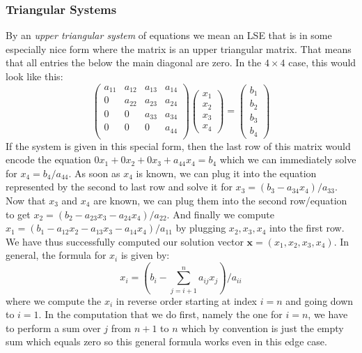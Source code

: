 \subsubsection{Triangular Systems}
By an \emph{upper triangular system} of equations we mean an LSE that is in some especially nice form where the matrix is an upper triangular matrix. That means that all entries the below the main diagonal are zero. In the  $4 \times 4$ case, this would look like this:
\begin{equation}
\begin{pmatrix}
a_{11} & a_{12} & a_{13} & a_{14} \\
 0     & a_{22} & a_{23} & a_{24} \\
 0     &   0    & a_{33} & a_{34} \\ 
 0     &   0    &    0   & a_{44} \\ 
\end{pmatrix}
\begin{pmatrix}
x_1 \\ x_2 \\ x_3 \\ x_4 
\end{pmatrix}
=
\begin{pmatrix}
b_1 \\ b_2 \\ b_3 \\ b_4 
\end{pmatrix}
\end{equation}
If the system is given in this special form, then the last row of this matrix would encode the equation $0 x_1 + 0 x_2 + 0 x_3 + a_{44} x_4 = b_4$ which we can immediately solve for $x_4 = b_4 / a_{44}$. As soon as $x_4$ is known, we can plug it into the equation represented by the second to last row and solve it for $x_3 = (b_3 - a_{34} x_4) / a_{33}$. Now that $x_3$ and $x_4$ are known, we can plug them into the second row/equation to get $x_2 = (b_2 - a_{23} x_3 - a_{24} x_4) / a_{22}$. And finally we compute $x_1 = (b_1 - a_{12} x_2 - a_{13} x_3 - a_{14} x_4) / a_{11}$ by plugging $x_2, x_3, x_4$ into the first row. We have thus successfully computed our solution vector $\mathbf{x} = (x_1,x_2,x_3,x_4)$. In general, the formula for $x_i$ is given by:
\begin{equation}
 x_i = \left( b_i - \sum_{j=i+1}^n a_{ij} x_j \right) / a_{ii}
\end{equation}
where we compute the $x_i$ in reverse order starting at index $i = n$ and going down to $i = 1$. In the computation that we do first, namely the one for $i = n$, we have to perform a sum over $j$ from $n+1$ to $n$ which by convention is just the empty sum which equals zero so this general formula works even in this edge case.

